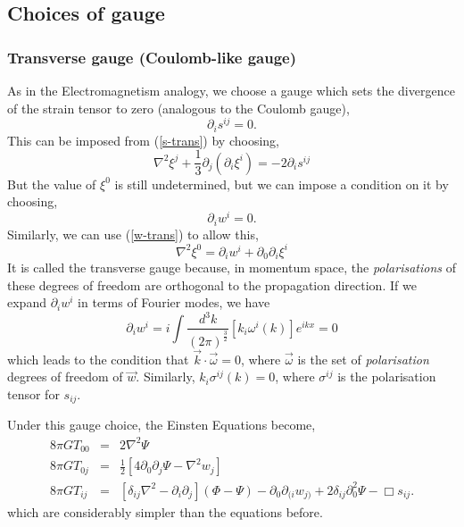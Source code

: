 \subsection{Choices of gauge}
\subsubsection{Transverse gauge (Coulomb-like gauge)}
As in the Electromagnetism analogy, we choose a gauge which sets the divergence of the strain tensor to zero (analogous to the Coulomb gauge), 
\begin{equation}
    \partial_is^{ij}=0.
\end{equation}
This can be imposed from (\ref{s-trans}) by choosing, 
\begin{equation}
    \nabla^2\xi^j + \frac{1}{3}\partial_j(\partial_i\xi^i) = -2\partial_is^{ij}
\end{equation}
But the value of $\xi^0$ is still undetermined, but we can impose a condition on it by choosing, 
\begin{equation}
    \partial_iw^i = 0. 
\end{equation}
Similarly, we can use (\ref{w-trans}) to allow this,
\begin{equation}
    \nabla^2\xi^0 = \partial_iw^i + \partial_0\partial_i\xi^i
\end{equation}
It is called the transverse gauge because, in momentum space, the \textit{polarisations} of these degrees of freedom are orthogonal to the propagation direction. If we expand $\partial_iw^i$ in terms of Fourier modes, we have
\begin{equation}
    \partial_iw^i=i\int\frac{d^3k}{(2\pi)^{\frac{3}{2}}}[k_i\omega^i(k)]e^{ikx}=0
\end{equation}
which leads to the condition that $\vec{k}\cdot \vec{\omega}=0$, where $\vec{\omega}$ is the set of \textit{polarisation} degrees of freedom of $\vec{w}$. Similarly, $k_{i}\sigma^{ij}(k)=0$, where $\sigma^{ij}$ is the polarisation tensor for $s_{ij}$.

Under this gauge choice, the Einsten Equations become, 
\begin{eqnarray}
    8\pi GT_{00} &=& 2\nabla^2\Psi \\ 
    8\pi GT_{0j} &=& \frac{1}{2}\left[4\partial_0\partial_j\Psi - \nabla^2w_j\right] \\
    8\pi GT_{ij} &=& \left[\delta_{ij}\nabla^2 - \partial_i\partial_j\right](\Phi-\Psi) - \partial_0\partial_{(i}w_{j)} + 2\delta_{ij}\partial_0^2\Psi - \Box s_{ij}.
\end{eqnarray}
which are considerably simpler than the equations before. 


